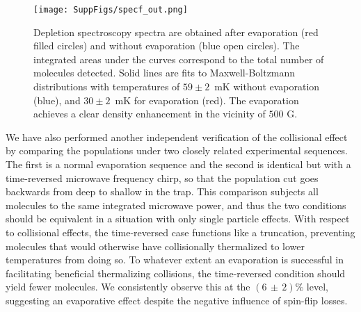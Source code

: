 \documentclass[%
 reprint,
 amsmath,amssymb,
 aps,
prl,
]{revtex4-1}
\begin{document}
\begin{figure}[tb]
\texttt{[image: SuppFigs/specf\_out.png]}%
\caption{
Depletion spectroscopy spectra are obtained after evaporation (red filled circles) and without evaporation (blue open circles). The integrated areas under the curves correspond to the total number of molecules detected. Solid lines are fits to Maxwell-Boltzmann distributions with temperatures of $59\pm2$~mK without evaporation (blue), and $30\pm2$~mK for evaporation (red). The evaporation achieves a clear density enhancement in the vicinity of $500\text{ G}$.
}
\label{fig:normenhance}
\end{figure}

We have also performed another independent verification of the collisional effect by comparing the populations under two closely related experimental sequences.
The first is a normal evaporation sequence and the second is identical but with a time-reversed microwave frequency chirp, so that the population cut goes backwards from deep to shallow in the trap.
This comparison subjects all molecules to the same integrated microwave power, and thus the two conditions should be equivalent in a situation with only single particle effects.
With respect to collisional effects, the time-reversed case functions like a truncation, preventing molecules that would otherwise have collisionally thermalized to lower temperatures from doing so.
To whatever extent an evaporation is successful in facilitating beneficial thermalizing collisions, the time-reversed condition should yield fewer molecules.
We consistently observe this at the $(6\,{\pm}\,2)\%$ level, suggesting an evaporative effect despite the negative influence of spin-flip losses.%
\end{document}
